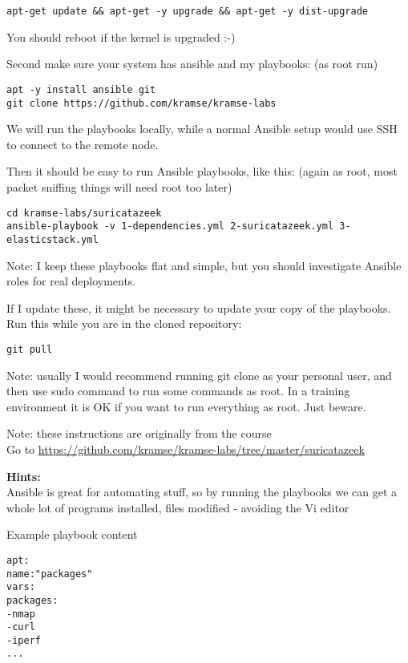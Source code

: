 \documentclass[a4paper,11pt,notitlepage]{report}
\begin{document}
\begin{verbatim}
apt-get update && apt-get -y upgrade && apt-get -y dist-upgrade
\end{verbatim}

You should reboot if the kernel is upgraded :-)

Second make sure your system has ansible and my playbooks: (as root run)
\begin{verbatim}
apt -y install ansible git
git clone https://github.com/kramse/kramse-labs
\end{verbatim}

We will run the playbooks locally, while a normal Ansible setup would use SSH to connect to the remote node.

Then it should be easy to run Ansible playbooks, like this: (again as root, most packet sniffing things will need root too later)

\begin{verbatim}
cd kramse-labs/suricatazeek
ansible-playbook -v 1-dependencies.yml 2-suricatazeek.yml 3-elasticstack.yml
\end{verbatim}

Note: I keep these playbooks flat and simple, but you should investigate Ansible roles for real deployments.

If I update these, it might be necessary to update your copy of the playbooks. Run this while you are in the cloned repository:

\begin{verbatim}
git pull
\end{verbatim}

Note: usually I would recommend running git clone as your personal user, and then use sudo command to run some commands as root. In a training environment it is OK if you want to run everything as root. Just beware.

Note: these instructions are originally from the course\\
Go to \url{https://github.com/kramse/kramse-labs/tree/master/suricatazeek}

{\bf Hints:}\\
Ansible is great for automating stuff, so by running the playbooks we can get a whole lot of programs installed, files modified - avoiding the Vi editor \smiley

Example playbook content
\begin{alltt}
apt:
      name: "{{ packages }}"
    vars:
      packages:
        - nmap
        - curl
        - iperf
        ...
\end{alltt}
\end{document}
